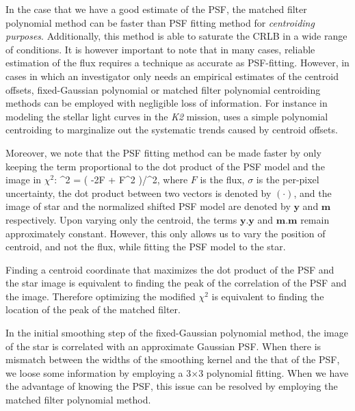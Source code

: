 In the case that we have a good estimate of the PSF, the matched filter polynomial method can be faster than PSF fitting method for \emph{centroiding} \emph{purposes}. Additionally, this method is able to saturate the CRLB in a wide range of conditions. It is however important to note that in many cases, reliable estimation of the flux requires a technique as accurate as PSF-fitting. However, in cases in which an investigator only needs an empirical estimates of the centroid offsets, fixed-Gaussian polynomial or matched filter polynomial centroiding methods can be employed with negligible loss of information. For instance in modeling the stellar light curves in the \emph{K2} mission, \citet{dfm} uses a simple polynomial centroiding to marginalize out the systematic trends caused by centroid offsets. 


Moreover, we note that the PSF fitting method can be made faster by only keeping the term proportional to the dot product of the PSF model and the image in $\chi^2$:
\beq
\chi^{2} = \big( \cdot {} -2F \cdot {} + F^{2} \cdot {}\big)/\sigma^{2},
\eeq
where $F$ is the flux, $\sigma$ is the per-pixel uncertainty, the dot product between two vectors is denoted by $(\cdot)$, and the image of star and the normalized shifted PSF model are denoted by $\mathbf{y}$ and $\mathbf{m}$ respectively. Upon varying only the centroid, the terms $\mathbf{y}.\mathbf{y}$ and $\mathbf{m}.\mathbf{m}$ remain approximately constant. However, this only allows us to vary the position of centroid, and not the flux, while fitting the PSF model to the star. 

Finding a centroid coordinate that maximizes the dot product of the PSF and the star image is equivalent to finding the peak of the correlation of the PSF and the image. Therefore optimizing the modified $\chi^2$ is equivalent to finding the location of the peak of the matched filter. 

In the initial smoothing step of the fixed-Gaussian polynomial method, the image of the star is
correlated with an approximate Gaussian PSF. When there is mismatch between the widths of the smoothing kernel and the that of the PSF, we loose some information by employing a 3$\times$3 polynomial fitting. When we have the advantage of knowing the PSF, this issue can be resolved by employing the matched filter polynomial method.

